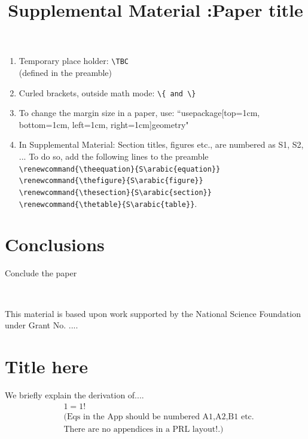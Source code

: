 \documentclass[pre,aps,reprint,noshowpacs,superscriptaddress,floatfix,letterpaper,longbibliography]{revtex4-2}
\makeatletter
\newcommand{\TBC}{\magenta{[TBC]}}
\newcommand{\magenta}{\textcolor{magenta}}
\def\maketitle{
\@author@finish
\title@column\titleblock@produce
\suppressfloats[t]}
\makeatother
\begin{document}
\begin{enumerate}
\item Temporary place holder: \verb|\TBC| \\ (defined in the preamble)

\item Curled brackets, outside math mode: \verb|\{ and \} |

\item To change the margin size in a paper, use: ``usepackage[top=1cm, bottom=1cm, left=1cm, right=1cm]{geometry}"  

\item In Supplemental Material: Section titles, figures etc., are numbered as S1, S2, ... To do so, add the following lines to the preamble 
\verb|\renewcommand{\theequation}{S\arabic{equation}}|
\verb|\renewcommand{\thefigure}{S\arabic{figure}}|
\verb|\renewcommand{\thesection}{S\arabic{section}}|
\verb|\renewcommand{\thetable}{S\arabic{table}}|. 

\label{List:Latex}
\end{enumerate}

\lipsum[2-2]

\section{Conclusions}

Conclude the paper

\lipsum[2-3]
\\ 

\begin{acknowledgments}
This material is based upon work supported by the National Science Foundation under Grant No. ....

\end{acknowledgments}

 

\appendix

\section{Title here}
\label{AppAT} 
We briefly explain the derivation of.... 
\begin{align}
    &1=1!\nonumber\\ 
    &(\text{Eqs in the App should be numbered A1,A2,B1 etc.}\nonumber\\ 
    &\text{There are no appendices in a PRL layout!.)}
\end{align}



\clearpage
\setcounter{figure}{0}
\setcounter{section}{0}
\renewcommand{\thefigure}{SM\arabic{figure}}
\title{Supplemental Material :Paper title }
\maketitle

\end{document}
